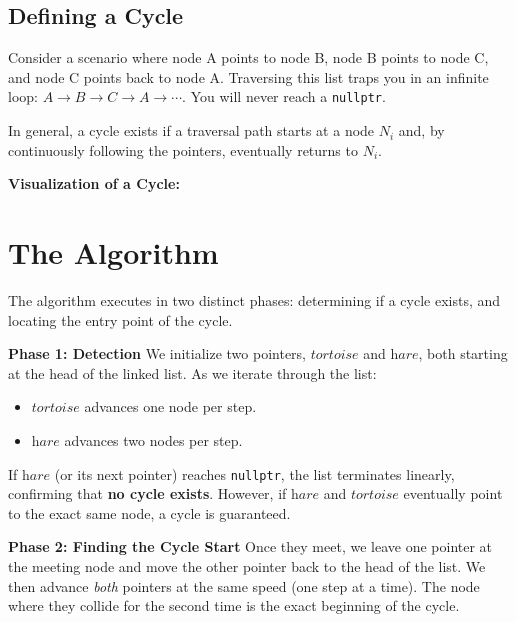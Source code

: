 \documentclass[12pt, letterpaper]{article}
\newcommand{\tortoise}{\textit{tortoise}}
\newcommand{\hare}{\textit{hare}}
\begin{document}
\subsection{Defining a Cycle}
Consider a scenario where node A points to node B, node B points to node C, and node C points back to node A. Traversing this list traps you in an infinite loop: $A \rightarrow B \rightarrow C \rightarrow A \rightarrow \cdots$. You will never reach a \texttt{nullptr}. 

In general, a cycle exists if a traversal path starts at a node $N_i$ and, by continuously following the pointers, eventually returns to $N_i$. 

\textbf{Visualization of a Cycle:}
\begin{center}
\end{center}

\section{The Algorithm}
The algorithm executes in two distinct phases: determining if a cycle exists, and locating the entry point of the cycle.

\textbf{Phase 1: Detection}
We initialize two pointers, \(\tortoise\) and \(\hare\), both starting at the head of the linked list. As we iterate through the list:
\begin{itemize}
    \item \(\tortoise\) advances one node per step.
    \item \(\hare\) advances two nodes per step.
\end{itemize}
If \(\hare\) (or its next pointer) reaches \texttt{nullptr}, the list terminates linearly, confirming that \textbf{no cycle exists}. However, if \(\hare\) and \(\tortoise\) eventually point to the exact same node, a cycle is guaranteed. 

\textbf{Phase 2: Finding the Cycle Start}
Once they meet, we leave one pointer at the meeting node and move the other pointer back to the head of the list. We then advance \emph{both} pointers at the same speed (one step at a time). The node where they collide for the second time is the exact beginning of the cycle.
\end{document}
